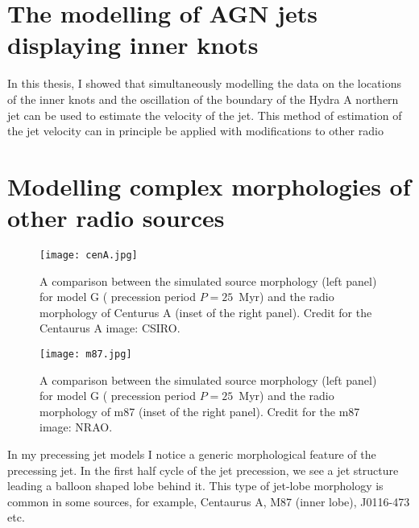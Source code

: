 
\section{The modelling of AGN jets displaying inner knots}
In this thesis, I showed that simultaneously modelling the data on the locations of the inner knots and the oscillation of the boundary of the Hydra A northern jet can be used to estimate the velocity of the jet. This method of estimation of the jet velocity can in principle be applied with modifications to other radio

\section{Modelling complex morphologies of other radio sources}
\begin{figure}
\centering
\texttt{[image: cenA.jpg]}
\caption{ A comparison between the simulated source morphology (left panel) for model G ( precession period $P = 25$~Myr) and the radio morphology of Centurus A (inset of the right panel). Credit for the Centaurus A image: CSIRO.}
\label{f:cenA}
\end{figure}
\begin{figure}
\centering
\texttt{[image: m87.jpg]}
\caption{ A comparison between the simulated source morphology (left panel) for model G ( precession period $P = 25$~Myr) and the radio morphology of m87 (inset of the right panel). Credit for the m87 image: NRAO.}
\label{f:m87}
\end{figure}
In my precessing jet models I notice a generic morphological feature of the precessing jet. In the first half cycle of the jet precession, we see a jet structure leading a balloon shaped lobe behind it. This type of jet-lobe morphology is common in some sources, for example, Centaurus A, M87 (inner lobe), J0116-473 etc.

